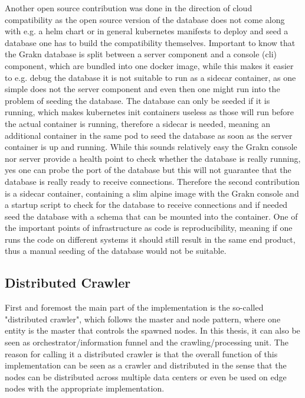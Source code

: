 Another open source contribution was done in the direction of cloud compatibility as the open source version of the database does not come along with e.g. a helm chart or in general kubernetes manifests to deploy and seed a database one has to build the compatibility themselves. Important to know that the Grakn database is split between a server component and a console (cli) component, which are bundled into one docker image, while this makes it easier to e.g. debug the database it is not suitable to run as a sidecar container, as one simple does not the server component and even then one might run into the problem of seeding the database. The database can only be seeded if it is running, which makes kubernetes init containers useless as those will run before the actual container is running, therefore a sidecar is needed, meaning an additional container in the same pod to seed the database as soon as the server container is up and running. While this sounds relatively easy the Grakn console nor server provide a health point to check whether the database is really running, yes one can probe the port of the database but this will not guarantee that the database is really ready to receive connections. Therefore the second contribution is a sidecar container, containing a slim alpine image with the Grakn console and a startup script to check for the database to receive connections and if needed seed the database with a schema that can be mounted into the container.
One of the important points of infrastructure as code is reproducibility, meaning if one runs the code on different systems it should still result in the same end product, thus a manual seeding of the database would not be suitable.

\subsection{Distributed Crawler}
First and foremost the main part of the implementation is the so-called "distributed crawler", which follows the master and node pattern, where one entity is the master that controls the spawned nodes. In this thesis, it can also be seen as orchestrator/information funnel and the crawling/processing unit. The reason for calling it a distributed crawler is that the overall function of this implementation can be seen as a crawler and distributed in the sense that the nodes can be distributed across multiple data centers or even be used on edge nodes with the appropriate implementation.

